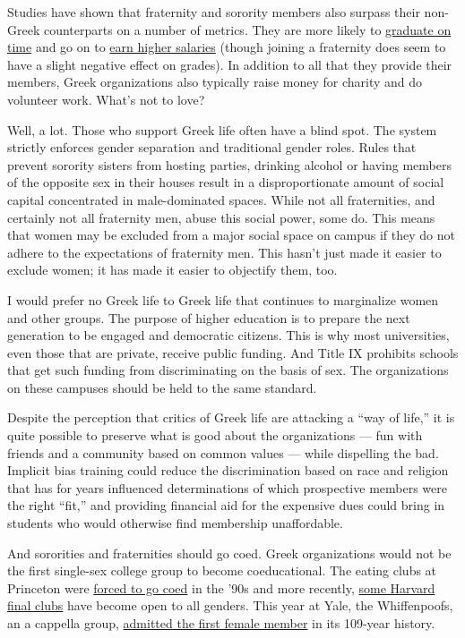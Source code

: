 Studies have shown that fraternity and sorority members also surpass
their non-Greek counterparts on a number of metrics. They are more
likely to
\href{https://www.sciencedirect.com/science/article/pii/S2214804314000147?via\%3Dihub}{graduate
on time} and go on to
\href{https://papers.ssrn.com/sol3/papers.cfm?abstract_id=2763720}{earn
higher salaries} (though joining a fraternity does seem to have a slight
negative effect on grades). In addition to all that they provide their
members, Greek organizations also typically raise money for charity and
do volunteer work. What's not to love?

Well, a lot. Those who support Greek life often have a blind spot. The
system strictly enforces gender separation and traditional gender roles.
Rules that prevent sorority sisters from hosting parties, drinking
alcohol or having members of the opposite sex in their houses result in
a disproportionate amount of social capital concentrated in
male-dominated spaces. While not all fraternities, and certainly not all
fraternity men, abuse this social power, some do. This means that women
may be excluded from a major social space on campus if they do not
adhere to the expectations of fraternity men. This hasn't just made it
easier to exclude women; it has made it easier to objectify them, too.

I would prefer no Greek life to Greek life that continues to marginalize
women and other groups. The purpose of higher education is to prepare
the next generation to be engaged and democratic citizens. This is why
most universities, even those that are private, receive public funding.
And Title IX prohibits schools that get such funding from discriminating
on the basis of sex. The organizations on these campuses should be held
to the same standard.

Despite the perception that critics of Greek life are attacking a ``way
of life,'' it is quite possible to preserve what is good about the
organizations --- fun with friends and a community based on common
values --- while dispelling the bad. Implicit bias training could reduce
the discrimination based on race and religion that has for years
influenced determinations of which prospective members were the right
``fit,'' and providing financial aid for the expensive dues could bring
in students who would otherwise find membership unaffordable.

And sororities and fraternities should go coed. Greek organizations
would not be the first single-sex college group to become coeducational.
The eating clubs at Princeton were
\href{https://www.nytimes3xbfgragh.onion/1991/01/28/nyregion/princeton-women-forge-a-new-era.html}{forced
to go coed} in the '90s and more recently,
\href{http://www.thecrimson.com/article/2017/5/25/coping-with-coed/}{some
Harvard final clubs} have become open to all genders. This year at Yale,
the Whiffenpoofs, an a cappella group,
\href{https://www.nytimes3xbfgragh.onion/2018/02/20/nyregion/yale-whiffenpoofs-first-woman.html}{admitted
the first female member} in its 109-year history.

